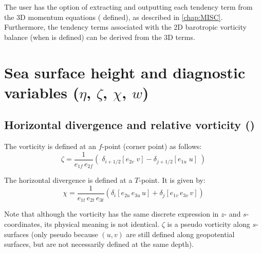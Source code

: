 \documentclass[../main/NEMO_manual]{subfiles}
\begin{document}
The user has the option of extracting and outputting each tendency term from the 3D momentum equations
( defined), as described in \autoref{chap:MISC}.
Furthermore, the tendency terms associated with the 2D barotropic vorticity balance (when  is defined)
can be derived from the 3D terms.

\section{Sea surface height and diagnostic variables ($\eta$, $\zeta$, $\chi$, $w$)}
\label{sec:DYN_divcur_wzv}

\subsection{Horizontal divergence and relative vorticity (\protect{})}
\label{subsec:DYN_divcur}

The vorticity is defined at an $f$-point (\ie corner point) as follows:
\begin{equation}
  \label{eq:divcur_cur}
  \zeta =\frac{1}{e_{1f}\,e_{2f} }\left( {\;\delta_{i+1/2} \left[ {e_{2v}\;v} \right]
      -\delta_{j+1/2} \left[ {e_{1u}\;u} \right]\;} \right)
\end{equation} 

The horizontal divergence is defined at a $T$-point.
It is given by:
\[
  \chi =\frac{1}{e_{1t}\,e_{2t}\,e_{3t} }
  \left( {\delta_i \left[ {e_{2u}\,e_{3u}\,u} \right]
      +\delta_j \left[ {e_{1v}\,e_{3v}\,v} \right]} \right)
\]

Note that although the vorticity has the same discrete expression in $z$- and $s$-coordinates,
its physical meaning is not identical.
$\zeta$ is a pseudo vorticity along $s$-surfaces
(only pseudo because $(u,v)$ are still defined along geopotential surfaces,
but are not necessarily defined at the same depth).
\end{document}
